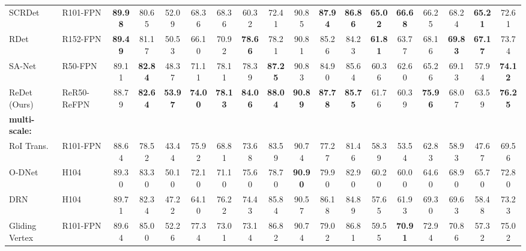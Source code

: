\documentclass[final]{cvpr}
\def\red#1{\textbf{\textcolor[RGB]{244, 67, 54}{#1}}}
\def\blue#1{\textbf{\textcolor[RGB]{60, 120, 216}{#1}}}
\begin{document}
{\begin{table*}
\begin{center}
{\begin{tabular}{l|l|ccccccccccccccc|c}
SCRDet~\cite{yang2019scrdet}               & R101-FPN    & \red{89.98}  & 80.65        & 52.09        & 68.36        & 68.36        & 60.32        & 72.41        & 90.85        & \red{87.94}  & \red{86.86}  & \red{65.02}  & \red{66.68}  & 66.25        & 68.24        & \blue{65.21} & 72.61        \\
RDet~\cite{yang2019r3det}              & R152-FPN    & \blue{89.49} & 81.17        & 50.53        & 66.10        & 70.92        & \blue{78.66} & 78.21        & 90.81        & 85.26        & 84.23        & \blue{61.81} & 63.77        & 68.16        & \blue{69.83} & \red{67.17}  & 73.74        \\
SA-Net~\cite{han2020align}             & R50-FPN     & 89.11        & \red{82.84}  & 48.37        & 71.11        & 78.11        & 78.39        & \blue{87.25} & 90.83        & 84.90        & 85.64        & 60.36        & 62.60        & 65.26        & 69.13        & 57.94        & \blue{74.12} \\
ReDet (Ours)                               & ReR50-ReFPN & 88.79        & \blue{82.64} & \red{53.97}  & \red{74.00}  & \blue{78.13} & \red{84.06}  & \red{88.04}  & \blue{90.89} & \blue{87.78} & \blue{85.75} & 61.76        & 60.39        & \red{75.96}  & 68.07        & 63.59        & \red{76.25}  \\ \hline
\textbf{multi-scale:}&&&&&&&&&&&&&&&& \\
RoI Trans.~\cite{ding2018transformer}  & R101-FPN    & 88.64        & 78.52        & 43.44        & 75.92        & 68.81        & 73.68        & 83.59        & 90.74        & 77.27        & 81.46        & 58.39        & 53.54        & 62.83        & 58.93        & 47.67        & 69.56        \\
O-DNet~\cite{wei2020oriented}      & H104        & 89.30        & 83.30        & 50.10        & 72.10        & 71.10        & 75.60        & 78.70        & \red{90.90}  & 79.90        & 82.90        & 60.20        & 60.00        & 64.60        & 68.90        & 65.70        & 72.80        \\
DRN~\cite{pan2020dynamic}              & H104        & 89.71        & 82.34        & 47.22        & 64.10        & 76.22        & 74.43        & 85.84        & 90.57        & 86.18        & 84.89        & 57.65        & 61.93        & 69.30        & 69.63        & 58.48        & 73.23        \\
Gliding Vertex~\cite{xu2019gliding}    & R101-FPN    & 89.64        & 85.00        & 52.26        & 77.34        & 73.01        & 73.14        & 86.82        & 90.74        & 79.02        & 86.81        & 59.55        & \red{70.91}  & 72.94        & 70.86        & 57.32        & 75.02        \\

\end{tabular}}
\end{center}
\end{table*}}
\end{document}
